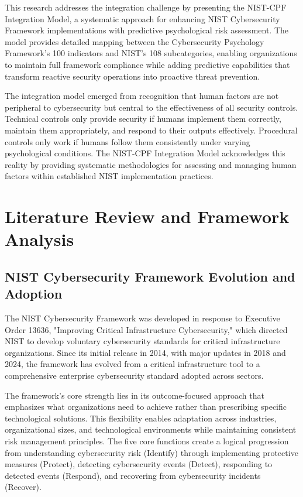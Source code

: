 \documentclass[10pt, twocolumn]{article}
\begin{document}
This research addresses the integration challenge by presenting the NIST-CPF Integration Model, a systematic approach for enhancing NIST Cybersecurity Framework implementations with predictive psychological risk assessment. The model provides detailed mapping between the Cybersecurity Psychology Framework's 100 indicators and NIST's 108 subcategories, enabling organizations to maintain full framework compliance while adding predictive capabilities that transform reactive security operations into proactive threat prevention.

The integration model emerged from recognition that human factors are not peripheral to cybersecurity but central to the effectiveness of all security controls. Technical controls only provide security if humans implement them correctly, maintain them appropriately, and respond to their outputs effectively. Procedural controls only work if humans follow them consistently under varying psychological conditions. The NIST-CPF Integration Model acknowledges this reality by providing systematic methodologies for assessing and managing human factors within established NIST implementation practices.

\section{Literature Review and Framework Analysis}

\subsection{NIST Cybersecurity Framework Evolution and Adoption}

The NIST Cybersecurity Framework was developed in response to Executive Order 13636, "Improving Critical Infrastructure Cybersecurity," which directed NIST to develop voluntary cybersecurity standards for critical infrastructure organizations. Since its initial release in 2014, with major updates in 2018 and 2024, the framework has evolved from a critical infrastructure tool to a comprehensive enterprise cybersecurity standard adopted across sectors\cite{nist2024framework}.

The framework's core strength lies in its outcome-focused approach that emphasizes what organizations need to achieve rather than prescribing specific technological solutions. This flexibility enables adaptation across industries, organizational sizes, and technological environments while maintaining consistent risk management principles. The five core functions create a logical progression from understanding cybersecurity risk (Identify) through implementing protective measures (Protect), detecting cybersecurity events (Detect), responding to detected events (Respond), and recovering from cybersecurity incidents (Recover).
\end{document}
